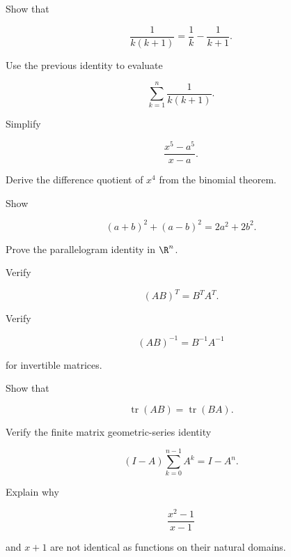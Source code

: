\begin{exercise}[3]
Show that

\[
\frac{1}{k(k+1)}
=
\frac1k-\frac1{k+1}.
\]
\end{exercise}

\begin{exercise}[3]
Use the previous identity to evaluate

\[
\sum_{k=1}^{n}
\frac{1}{k(k+1)}.
\]
\end{exercise}

\begin{exercise}[3]
Simplify

\[
\frac{x^5-a^5}{x-a}.
\]
\end{exercise}

\begin{exercise}[3]
Derive the difference quotient of \(x^4\) from the binomial theorem.
\end{exercise}

\begin{exercise}[3]
Show

\[
(a+b)^2+(a-b)^2
=
2a^2+2b^2.
\]
\end{exercise}

\begin{exercise}[3]
Prove the parallelogram identity in \(\R^n\).
\end{exercise}

\begin{exercise}[3]
Verify

\[
(AB)^T
=
B^TA^T.
\]
\end{exercise}

\begin{exercise}[3]
Verify

\[
(AB)^{-1}
=
B^{-1}A^{-1}
\]

for invertible matrices.
\end{exercise}

\begin{exercise}[3]
Show that

\[
\operatorname{tr}(AB)
=
\operatorname{tr}(BA).
\]
\end{exercise}

\begin{exercise}[3]
Verify the finite matrix geometric-series identity

\[
(I-A)
\sum_{k=0}^{n-1}A^k
=
I-A^n.
\]
\end{exercise}

\begin{exercise}[3]
Explain why

\[
\frac{x^2-1}{x-1}
\]

and \(x+1\) are not identical as functions on their natural domains.
\end{exercise}

